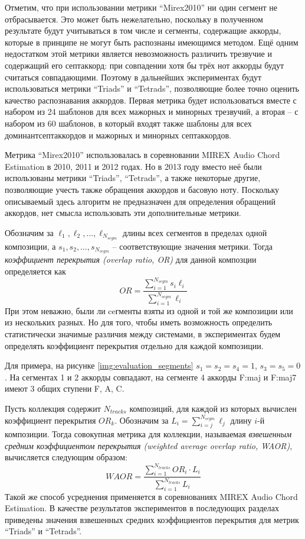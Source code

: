 Отметим, что при использовании метрики ``Mirex2010'' ни один сегмент не
отбрасывается. Это может быть нежелательно, поскольку в полученном результате
будут учитываться в том числе и сегменты, содержащие аккорды, которые в принципе
не могут быть распознаны имеющимся методом. Ещё одним недостатком этой метрики
является невозможность различить трезвучие и содержащий его септаккорд: при
совпадении хотя бы трёх нот аккорды будут считаться совпадающими. Поэтому в
дальнейших экспериментах будут использоваться метрики ``Triads'' и ``Tetrads'',
позволяющие более точно оценить качество распознавания аккордов. Первая метрика
будет использоваться вместе с набором из 24 шаблонов для всех мажорных и
минорных трезвучий, а вторая -- с набором из 60 шаблонов, в который входят также
шаблоны для всех доминантсептаккордов и мажорных и минорных септаккордов.

Метрика ``Mirex2010'' использовалась в соревновании MIREX Audio Chord Estimation
в 2010, 2011 и 2012 годах. Но в 2013 году вместо неё были использованы метрики
``Triads'', ``Tetrads'', а также некоторые другие, позволяющие учесть также
обращения аккордов и басовую ноту. Поскольку описываемый здесь алгоритм не
предназначен для определения обращений аккордов, нет смысла использовать эти
дополнительные метрики.

Обозначим за $\ell_1, \ell_2, \ldots, \ell_{N_{segm}}$ длины всех сегментов в
пределах одной композиции, а $s_1, s_2, \ldots, s_{N_{segm}}$ -- соответствующие
значения метрики. Тогда \emph{коэффициент перекрытия (overlap ratio, OR)} для
данной композции определяется как
\begin{equation} \label{eq:or}
OR = \frac{\sum_{i=1}^{N_{segm}} s_i \ell_i}{\sum_{i=1}^{N_{segm}} \ell_i}
\end{equation}
При этом неважно, были ли ceгменты взяты из одной и той же композиции или из
нескольких разных. Но для того, чтобы иметь возможность определить
статистически значимые различия между системами, в экспериментах будем
определять коэффициент перекрытия отдельно для каждой композиции.

Для примера, на рисунке \ref{img:evaluation_segments} $s_1 = s_2 = s_4 = 1$,
$s_3 = s_5 = 0$. На сегментах 1 и 2 аккорды совпадают, на сегменте 4 аккорды
F:maj и F:maj7 имеют 3 общих ступени F, A, C.

Пусть коллекция содержит $N_{tracks}$ композиций, для каждой из которых
вычислен коэффициент перекрытия $OR_k$. Обозначим за $L_i =
\sum_{i=j}^{N_{segm}} \ell_j$ длину $i$-й композиции. Тогда совокупная метрика
для коллекции, называемая \emph{взвешенным средним коэффициентом перекрытия
(weighted average overlap ratio, WAOR)}, вычисляется следующим образом:
\begin{equation} \label{eq:waor}
WAOR = \frac{\sum_{i=1}^{N_{tracks}} OR_i \cdot L_i}{\sum_{i=1}^{N_{tracks}}
L_i}
\end{equation}
Такой же способ усреднения применяется в соревнованиях MIREX Audio Chord
Estimation. В качестве результатов экспериментов в последующих разделах
приведены значения взвешенных средних коэффициентов перекрытия для метрик
``Triads'' и ``Tetrads''.

